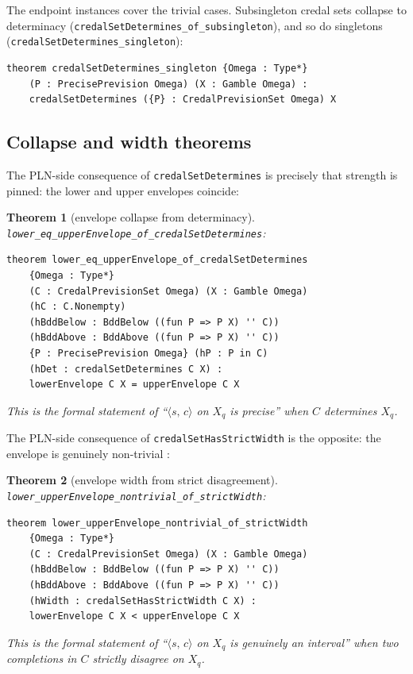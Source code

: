 \documentclass[]{article}
\newtheorem{theorem}{Theorem}
\newcommand{\lid}[1]{{\ttfamily\nolinkurl{#1}}}
\newcommand{\STV}[2]{\langle #1,\, #2 \rangle}
\begin{document}
The endpoint instances cover the trivial cases. Subsingleton credal sets
collapse to determinacy
(\lid{credalSetDetermines\_of\_subsingleton}), and so do
singletons (\lid{credalSetDetermines\_singleton}):
\begin{lstlisting}
theorem credalSetDetermines_singleton {Omega : Type*}
    (P : PrecisePrevision Omega) (X : Gamble Omega) :
    credalSetDetermines ({P} : CredalPrevisionSet Omega) X
\end{lstlisting}

\subsection{Collapse and width theorems}

The PLN-side consequence of \lid{credalSetDetermines} is precisely
that strength is pinned: the lower and upper envelopes coincide:
\begin{theorem}[envelope collapse from determinacy]\label{thm:collapse}
\lid{lower\_eq\_upperEnvelope\_of\_credalSetDetermines}:
\begin{lstlisting}
theorem lower_eq_upperEnvelope_of_credalSetDetermines
    {Omega : Type*}
    (C : CredalPrevisionSet Omega) (X : Gamble Omega)
    (hC : C.Nonempty)
    (hBddBelow : BddBelow ((fun P => P X) '' C))
    (hBddAbove : BddAbove ((fun P => P X) '' C))
    {P : PrecisePrevision Omega} (hP : P in C)
    (hDet : credalSetDetermines C X) :
    lowerEnvelope C X = upperEnvelope C X
\end{lstlisting}
This is the formal statement of ``$\STV{s}{c}$ on $X_q$ is precise''
when $C$ determines $X_q$.
\end{theorem}

The PLN-side consequence of \lid{credalSetHasStrictWidth} is the opposite:
the envelope is genuinely non-trivial :
\begin{theorem}[envelope width from strict disagreement]\label{thm:width}
\lid{lower\_upperEnvelope\_nontrivial\_of\_strictWidth}:
\begin{lstlisting}
theorem lower_upperEnvelope_nontrivial_of_strictWidth
    {Omega : Type*}
    (C : CredalPrevisionSet Omega) (X : Gamble Omega)
    (hBddBelow : BddBelow ((fun P => P X) '' C))
    (hBddAbove : BddAbove ((fun P => P X) '' C))
    (hWidth : credalSetHasStrictWidth C X) :
    lowerEnvelope C X < upperEnvelope C X
\end{lstlisting}
This is the formal statement of ``$\STV{s}{c}$ on $X_q$ is genuinely an
interval'' when two completions in $C$ strictly disagree on $X_q$.
\end{theorem}
\end{document}
